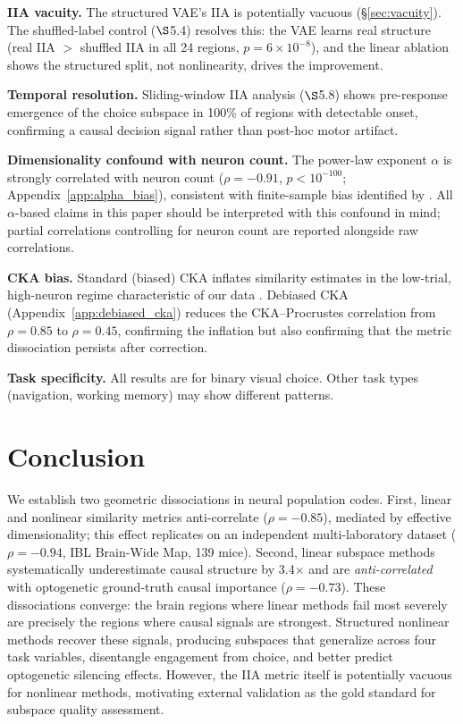 \documentclass{article}
\begin{document}
\textbf{IIA vacuity.} The structured VAE's IIA is potentially vacuous (\S\ref{sec:vacuity}). The shuffled-label control ($\S$5.4) resolves this: the VAE learns real structure (real IIA $> $ shuffled IIA in all 24 regions, $p = 6 \times 10^{-8}$), and the linear ablation shows the structured split, not nonlinearity, drives the improvement.

\textbf{Temporal resolution.} Sliding-window IIA analysis ($\S$5.8) shows pre-response emergence of the choice subspace in 100\% of regions with detectable onset, confirming a causal decision signal rather than post-hoc motor artifact.

\textbf{Dimensionality confound with neuron count.} The power-law exponent $\alpha$ is strongly correlated with neuron count ($\rho = -0.91$, $p < 10^{-100}$; Appendix~\ref{app:alpha_bias}), consistent with finite-sample bias identified by \citet{chun2025dimensionality}. All $\alpha$-based claims in this paper should be interpreted with this confound in mind; partial correlations controlling for neuron count are reported alongside raw correlations.

\textbf{CKA bias.} Standard (biased) CKA inflates similarity estimates in the low-trial, high-neuron regime characteristic of our data \citep{murphy2024biased}. Debiased CKA (Appendix~\ref{app:debiased_cka}) reduces the CKA--Procrustes correlation from $\rho = 0.85$ to $\rho = 0.45$, confirming the inflation but also confirming that the metric dissociation persists after correction.

\textbf{Task specificity.} All results are for binary visual choice. Other task types (navigation, working memory) may show different patterns.

\section{Conclusion}

We establish two geometric dissociations in neural population codes. First, linear and nonlinear similarity metrics anti-correlate ($\rho = -0.85$), mediated by effective dimensionality; this effect replicates on an independent multi-laboratory dataset ($\rho = -0.94$, IBL Brain-Wide Map, 139 mice). Second, linear subspace methods systematically underestimate causal structure by 3.4$\times$ and are \emph{anti-correlated} with optogenetic ground-truth causal importance ($\rho = -0.73$). These dissociations converge: the brain regions where linear methods fail most severely are precisely the regions where causal signals are strongest. Structured nonlinear methods recover these signals, producing subspaces that generalize across four task variables, disentangle engagement from choice, and better predict optogenetic silencing effects. However, the IIA metric itself is potentially vacuous for nonlinear methods, motivating external validation as the gold standard for subspace quality assessment.
\end{document}
